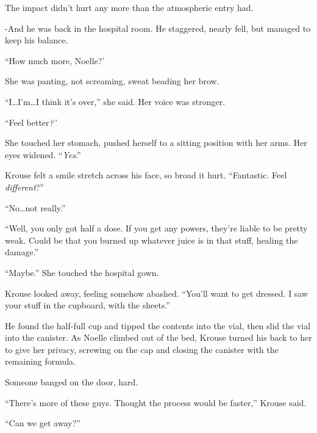 The impact didn't hurt any more than the atmospheric entry had.



-And he was back in the hospital room.  He staggered, nearly fell, but managed to keep his balance.



``How much more, Noelle?'



She was panting, not screaming, sweat beading her brow.



``I\ldots I'm\ldots I think it's over,'' she said.  Her voice was stronger.



``Feel better\emph{?'}



She touched her stomach, pushed herself to a sitting position with her arms.  Her eyes widened.  ``\emph{Yes}.''



Krouse felt a smile stretch across his face, so broad it hurt.  ``Fantastic.  Feel \emph{different}?''



``No\ldots not really.''



``Well, you only got half a dose.  If you get any powers, they're liable to be pretty weak.  Could be that you burned up whatever juice is in that stuff, healing the damage.''



``Maybe.''  She touched the hospital gown.



Krouse looked away, feeling somehow abashed.  ``You'll want to get dressed.  I saw your stuff in the cupboard, with the sheets.''



He found the half-full cup and tipped the contents into the vial, then slid the vial into the canister.  As Noelle climbed out of the bed, Krouse turned his back to her to give her privacy, screwing on the cap and closing the canister with the remaining formula.



Someone banged on the door, hard.



``There's more of these guys.  Thought the process would be faster,'' Krouse said.



``Can we get away?''



